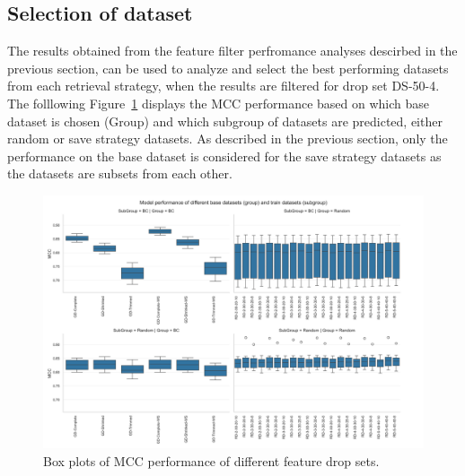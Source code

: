 \subsection{Selection of dataset}
\label{sec:dataset_selection}

The results obtained from the feature filter perfromance analyses descirbed in the previous section, can be used to analyze and select
the best performing datasets from each retrieval strategy, when the results are filtered for drop set DS-50-4.
The folllowing Figure~\ref{fig:dataset_performance_group_subgroup} displays the \gls{MCC} performance based on which base dataset is chosen (Group)
and which subgroup of datasets are predicted, either random or save strategy datasets. As described in the previous section, only the
performance on the base dataset is considered for the save strategy datasets as the datasets are subsets from each other.
\begin{figure}[ht]
    \centering
    \includegraphics[width =\textwidth]{pictures/feature_filter/group_subgroup_results.png}
    \caption{Box plots of MCC performance of different feature drop sets.}
    \label{fig:dataset_performance_group_subgroup}
\end{figure}

